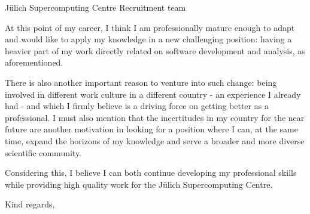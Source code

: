 \documentclass[11pt]{letter}
\begin{document}
\begin{letter}{Jülich Supercomputing Centre Recruitment team}

  
  At this point of my career, I think I am professionally mature enough to adapt and would like to apply my knowledge in a new challenging position: having a heavier part of my work directly related on software development and analysis, as aforementioned.

  There is also another important reason to venture into such change: being involved in different
  work culture in a different country - an experience I already had - and which I firmly believe is a driving force
  on getting better as a professional. I must also mention that the incertitudes in my country for the near future are another motivation in looking for a position where I can, at the same time, expand the horizons of my knowledge and serve a broader and more diverse scientific community.

  Considering this, I believe I can both continue developing my professional skills while providing high quality work
  for the Jülich Supercomputing Centre.
  
  \closing{Kind regards,}

  
\end{letter}
\end{document}

